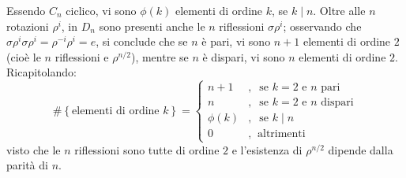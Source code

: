 \documentclass[11pt]{scrartcl}
\theoremstyle{style1}
\numberwithin{equation}{subsection}
\begin{document}
Essendo $C_n$ ciclico, vi sono $\phi (k)$ elementi di ordine $k$, se $k  \mid  n$.
Oltre alle $n$ rotazioni $\rho ^i$, in $D_n$ sono presenti anche le $n$ riflessioni $\sigma \rho ^i$; osservando che $\sigma \rho ^i \sigma \rho ^i = \rho ^{-i}\rho ^{i} = e $, si conclude che se $n$ \`e pari, vi sono $n+1$ elementi di ordine $2$ (cio\`e le $n$ riflessioni e $\rho ^{n / 2} $), mentre se $n$ \`e dispari, vi sono $n$ elementi di ordine $2$.
Ricapitolando:
\begin{equation}
\# \left\{ \text{elementi di ordine } k \right\} = \begin{cases}
	n + 1 &,\ \text{ se } k=2 \text{ e } n \text{ pari}\\
	n  &,\  \text{ se }k=2 \text{ e } n \text{ dispari}\\
	\phi (k)&,\ \text{ se } k \mid n\\
	0 &,\ \text{ altrimenti }
\end{cases}
\end{equation}
visto che le $n$ riflessioni sono tutte di ordine $2$ e l'esistenza di $\rho ^{n / 2} $ dipende dalla parit\`a di $n$.
\vspace*{5pt}
\end{document}
